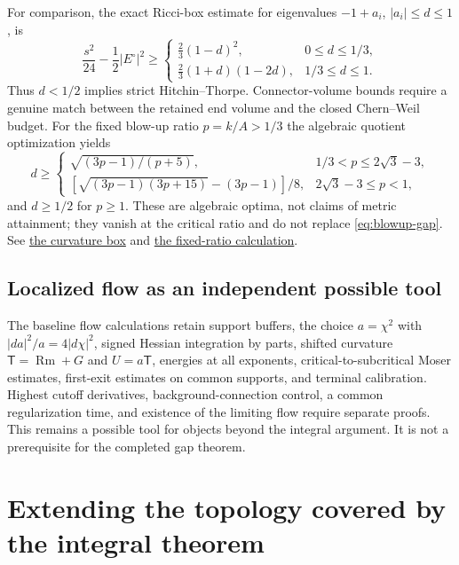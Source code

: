 \documentclass[11pt,a4paper]{article}
\theoremstyle{definition}
\theoremstyle{remark}
\DeclareMathOperator{\Rm}{Rm}
\newcommand{\roundref}[2]{\href{run:../references/rounds/#1}{#2}}
\numberwithin{equation}{section}
\begin{document}
For comparison, the exact Ricci-box estimate for eigenvalues
$-1+a_i$, $|a_i|\le d\le1$, is
\[
 \frac{s^2}{24}-\frac12|E^\circ|^2\ge
 \begin{cases}
 \frac23(1-d)^2,&0\le d\le1/3,\\
 \frac23(1+d)(1-2d),&1/3\le d\le1.
 \end{cases}
\]
Thus $d<1/2$ implies strict Hitchin--Thorpe. Connector-volume bounds
require a genuine match between the retained end volume and the closed
Chern--Weil budget. For the fixed blow-up ratio $p=k/A>1/3$ the
algebraic quotient optimization yields
\[
 d\ge\begin{cases}
 \sqrt{(3p-1)/(p+5)},&1/3<p\le2\sqrt3-3,\\
 [\sqrt{(3p-1)(3p+15)}-(3p-1)]/8,&2\sqrt3-3\le p<1,
 \end{cases}
\]
and $d\ge1/2$ for $p\ge1$. These are algebraic optima, not claims of
metric attainment; they vanish at the critical ratio and do not replace
\eqref{eq:blowup-gap}. See \roundref{curvature_box.md}{the curvature box}
and \roundref{fixed_ratio.md}{the fixed-ratio calculation}.

\subsection{Localized flow as an independent possible tool}\label{sub:legacy-flow}
The baseline flow calculations retain support buffers, the choice
$a=\chi^2$ with $|da|^2/a=4|d\chi|^2$, signed Hessian integration by
parts, shifted curvature $\mathsf T=\Rm+G$ and $U=a\mathsf T$,
energies at all exponents, critical-to-subcritical Moser estimates,
first-exit estimates on common supports, and terminal calibration.
Highest cutoff derivatives, background-connection control, a common
regularization time, and existence of the limiting flow require separate
proofs. This remains a possible tool for objects beyond the integral
argument. It is not a prerequisite for the completed gap theorem.

\section{Extending the topology covered by the integral theorem}\label{sec:cost-directions}
\end{document}
